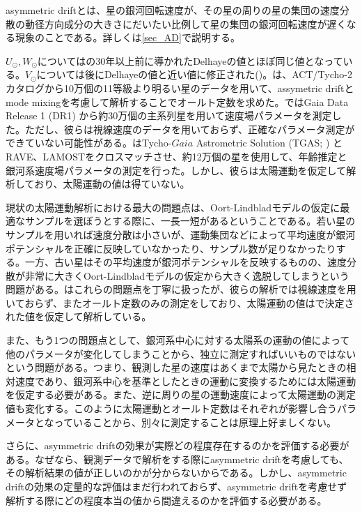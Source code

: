 asymmetric driftとは、星の銀河回転速度が、その星の周りの星の集団の速度分散の動径方向成分の大きさにだいたい比例して星の集団の銀河回転速度が遅くなる現象のことである。詳しくは\ref{sec_AD}で説明する。

$U_{\odot}, W_{\odot}$については\cite{DB1998}の30年以上前に導かれたDelhayeの値とほぼ同じ値となっている。$V_{\odot}$については後にDelhayeの値と近い値に修正された(\cite{Schonrich2010})。\cite{OD03}は、ACT/Tycho-2カタログから10万個の11等級より明るい星のデータを用いて、assymetric driftとmode mixingを考慮して解析することでオールト定数を求めた。\cite{Bovy17}ではGaia Data Release 1 (DR1) から約30万個の主系列星を用いて速度場パラメータを測定した。ただし、彼らは視線速度のデータを用いておらず、正確なパラメータ測定ができていない可能性がある。\cite{VS18}はTycho-$Gaia$ Astrometric Solution (TGAS; \cite{Gaia2016}) とRAVE、LAMOSTをクロスマッチさせ、約12万個の星を使用して、年齢推定と銀河系速度場パラメータの測定を行った。しかし、彼らは太陽運動を仮定して解析しており、太陽運動の値は得ていない。

現状の太陽運動解析における最大の問題点は、Oort-Lindbladモデルの仮定に最適なサンプルを選ぼうとする際に、一長一短があるということである。若い星のサンプルを用いれば速度分散は小さいが、運動集団などによって平均速度が銀河ポテンシャルを正確に反映していなかったり、サンプル数が足りなかったりする。一方、古い星はその平均速度が銀河ポテンシャルを反映するものの、速度分散が非常に大きくOort-Lindbladモデルの仮定から大きく逸脱してしまうという問題がある。\cite{OD03}はこれらの問題点を丁寧に扱ったが、彼らの解析では視線速度を用いておらず、またオールト定数のみの測定をしており、太陽運動の値は\cite{OD03}で決定された値を仮定して解析している。

また、もう1つの問題点として、銀河系中心に対する太陽系の運動の値によって他のパラメータが変化してしまうことから、独立に測定すればいいものではないという問題がある。つまり、観測した星の速度はあくまで太陽から見たときの相対速度であり、銀河系中心を基準としたときの運動に変換するためには太陽運動を仮定する必要がある。また、逆に周りの星の運動速度によって太陽運動の測定値も変化する。このように太陽運動とオールト定数はそれぞれが影響し合うパラメータとなっていることから、別々に測定することは原理上好ましくない。

さらに、asymmetric driftの効果が実際どの程度存在するのかを評価する必要がある。なぜなら、観測データで解析をする際にasymmetric driftを考慮しても、その解析結果の値が正しいのかが分からないからである。しかし、asymmetric driftの効果の定量的な評価はまだ行われておらず、asymmetric driftを考慮せず解析する際にどの程度本当の値から間違えるのかを評価する必要がある。

